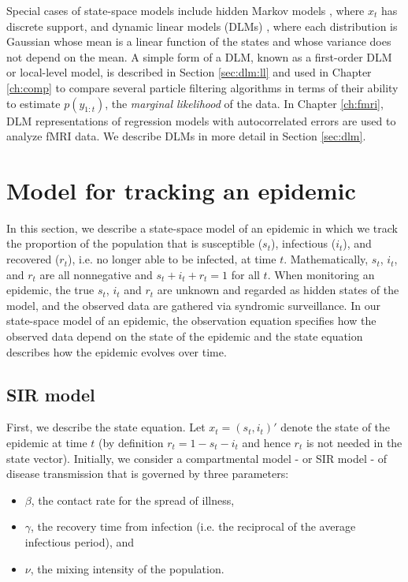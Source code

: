 Special cases of state-space models include hidden Markov models \citep{cappe:2005:inference}, where $x_t$ has discrete support, and dynamic linear models (DLMs) \citep{West:Harr:baye:1997, petris:camp:2009:dynamic}, where each distribution is Gaussian whose mean is a linear function of the states and whose variance does not depend on the mean. A simple form of a DLM, known as a first-order DLM or local-level model, is described in Section \ref{sec:dlm:ll} and used in Chapter \ref{ch:comp} to compare several particle filtering algorithms in terms of their ability to estimate $p(y_{1:t})$, the \emph{marginal likelihood} of the data. In Chapter \ref{ch:fmri}, DLM representations of regression models with autocorrelated errors are used to analyze fMRI data. We describe DLMs in more detail in Section \ref{sec:dlm}.

\section{Model for tracking an epidemic \label{sec:epid}}

In this section, we describe a state-space model of an epidemic in which we track the proportion of the population that is susceptible ($s_t$), infectious ($i_t$), and recovered ($r_t$), i.e. no longer able to be infected, at time $t$. Mathematically, $s_t$, $i_t$, and $r_t$ are all nonnegative and $s_t + i_t + r_t = 1$ for all $t$. When monitoring an epidemic, the true $s_t$, $i_t$ and $r_t$ are unknown and regarded as hidden states of the model, and the observed data are gathered via syndromic surveillance. In our state-space model of an epidemic, the observation equation specifies how the observed data depend on the state of the epidemic and the state equation describes how the epidemic evolves over time.

\subsection{SIR model \label{sec:epid:state}}

First, we describe the state equation. Let $x_t = (s_t,i_t)'$ denote the state of the epidemic at time $t$ (by definition $r_t=1-s_t-i_t$ and hence $r_t$ is not needed in the state vector). Initially, we consider a compartmental model - or SIR model - of disease transmission that is governed by three parameters:

\begin{itemize}
\item $\beta$, the contact rate for the spread of illness,
\item $\gamma$, the recovery time from infection (i.e. the reciprocal of the average infectious period), and
\item $\nu$, the mixing intensity of the population.
\end{itemize}

